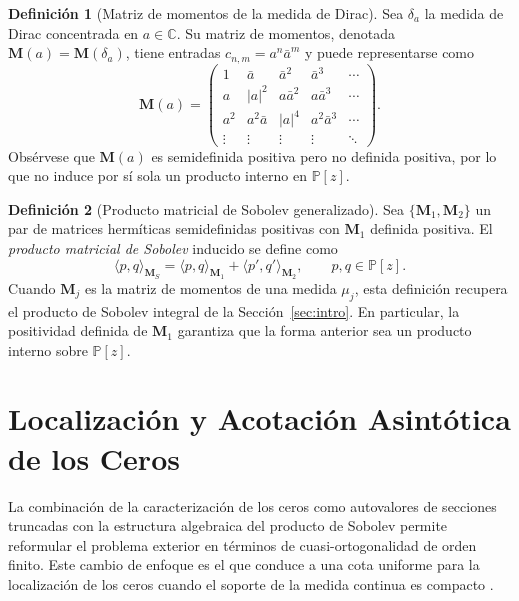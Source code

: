 \documentclass[12pt,a4paper]{article}
\theoremstyle{definition}
\newtheorem{definition}{Definición}
\theoremstyle{remark}
\newcommand{\Poly}{\mathbb{P}[z]}
\begin{document}
\begin{definition}[Matriz de momentos de la medida de Dirac]\label{def:matriz_dirac}
  Sea $\delta_a$ la medida de Dirac concentrada en $a \in \mathbb{C}$. Su matriz de momentos, denotada $\mathbf{M}(a) = \mathbf{M}(\delta_a)$, tiene entradas $c_{n,m} = a^n \bar{a}^m$ y puede representarse como
  \[
    \mathbf{M}(a) = \begin{pmatrix}
      1      & \bar{a}    & \bar{a}^2  & \bar{a}^3    & \cdots \\
      a      & |a|^2      & a\bar{a}^2 & a\bar{a}^3   & \cdots \\
      a^2    & a^2\bar{a} & |a|^4      & a^2\bar{a}^3 & \cdots \\
      \vdots & \vdots     & \vdots     & \vdots       & \ddots
    \end{pmatrix}.
  \]
  Obsérvese que $\mathbf{M}(a)$ es semidefinida positiva pero no definida positiva, por lo que no induce por sí sola un producto interno en $\Poly$.
\end{definition}

\begin{definition}[Producto matricial de Sobolev generalizado]\label{def:producto_sobolev_matricial}
  Sea $\{\mathbf{M}_1, \mathbf{M}_2\}$ un par de matrices hermíticas semidefinidas positivas con $\mathbf{M}_1$ definida positiva. El \emph{producto matricial de Sobolev} inducido se define como
  \[
    \langle p, q \rangle_{\mathbf{M}_S} = \langle p, q \rangle_{\mathbf{M}_1} + \langle p', q' \rangle_{\mathbf{M}_2}, \qquad p, q \in \Poly.
  \]
  Cuando $\mathbf{M}_j$ es la matriz de momentos de una medida $\mu_j$, esta definición recupera el producto de Sobolev integral de la Sección~\ref{sec:intro}. En particular, la positividad definida de $\mathbf{M}_1$ garantiza que la forma anterior sea un producto interno sobre $\Poly$.
\end{definition}

\section{Localización y Acotación Asintótica de los Ceros}\label{sec:ceros_acotacion}

La combinación de la caracterización de los ceros como autovalores de secciones truncadas con la estructura algebraica del producto de Sobolev permite reformular el problema exterior en términos de cuasi-ortogonalidad de orden finito. Este cambio de enfoque es el que conduce a una cota uniforme para la localización de los ceros cuando el soporte de la medida continua es compacto \cite{lopez1999zero,lopez2001sobolev,marcellan2015sobolev}.
\end{document}
